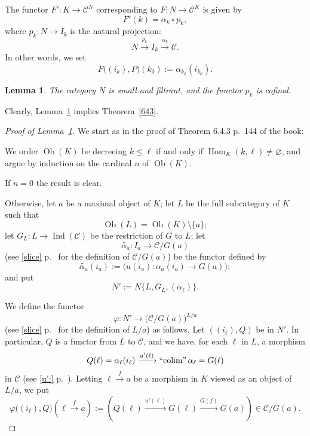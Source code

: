 \documentclass[12pt]{article}
\newtheorem{lem}[thm]{Lemma}
\theoremstyle{remark}
\theoremstyle{definition}
\newcommand{\C}{\mathcal C}
\newcommand{\pp}{\varphi}
\newcommand{\xr}{\xrightarrow}
\DeclareMathOperator*{\colim}{colim}
\DeclareMathOperator*{\icolim}{``\!\colim\!"}
\DeclareMathOperator{\Hom}{Hom}
\DeclareMathOperator{\Ind}{Ind}
\DeclareMathOperator{\Ob}{Ob}
\begin{document}
The functor $F':K\to\C^N$ corresponding to $F:N\to\C^K$ is given by 
$$
F'(k)=\alpha_k\circ p_k,
$$ 
where $p_k:N\to I_k$ is the natural projection: 
$$
N\xr{p_k}I_k\xr{\alpha_k}\C.
$$ 
In other words, we set
$$
F\big((i_k),P\big)(k_0):=\alpha_{k_0}(i_{k_0}).
$$ 

\begin{lem}\label{npk}
The category $N$ is small and filtrant, and the functor $p_k$ is cofinal.
\end{lem} 

Clearly, Lemma~\ref{npk} implies Theorem~\ref{643}.  

\begin{proof}[Proof of Lemma~\ref{npk}]
We start as in the proof of Theorem 6.4.3 p.~144 of the book: 

We order $\Ob(K)$ be decreeing $k\le\ell$ if and only if $\Hom_K(k,\ell)\neq\varnothing$, and argue by induction on the cardinal $n$ of $\Ob(K)$. 

If $n=0$ the result is clear.

Otherwise, let $a$ be a maximal object of $K$; let $L$ be the full subcategory of $K$ such that 
$$
\Ob(L)=\Ob(K)\setminus\{a\}; 
$$ 
let $G_L:L\to\Ind(\C)$ be the restriction of $G$ to $L$; let  
$$
\widetilde{\alpha_a}:I_a\to\C/G(a)
$$ 
(see \eqref{slice} p.~\pageref{slice} for the definition of $\C/G(a)$) be the functor defined by 
$$
\widetilde{\alpha_a}(i_a):=\Big(u(i_a):\alpha_a(i_a)\to G(a)\Big);
$$
and put 
$$
N':=N\{L,G_L,(\alpha_\ell)\}.
$$ 

We define the functor 
$$ 
\pp:N'\to\big(\C/G(a)\big)^{L/a} 
$$ 
(see \eqref{slice} p.~\pageref{slice} for the definition of $L/a$) as follows. Let $((i_\ell),Q)$ be in $N'$. In particular, $Q$ is a functor from $L$ to $\C$, and we have, for each $\ell$ in $L$, a morphism 
$$
Q(\ell)=\alpha_\ell(i_\ell)\xr{u'(\ell)}\icolim\alpha_\ell=G(\ell) 
$$ 
in $\C$ (see \eqref{u':} p.~\pageref{u':}). Letting $\ell\xr fa$ be a morphism in $K$ viewed as an object of $L/a$, we put  
$$
\pp\big((i_\ell),Q\big)\left(\ell\xr fa\right):=\left(Q(\ell)\xr{u'(\ell)}G(\ell)\xr{G(f)}G(a)\right)\in\C/G(a).
$$


\end{proof}
\end{document}
